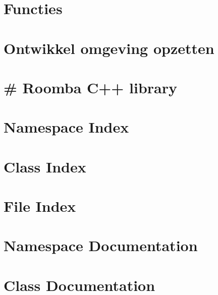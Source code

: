 \documentclass[twoside]{book}
\newcommand{\+}{\discretionary{\mbox{\scriptsize$\hookleftarrow$}}{}{}}
\begin{document}
\chapter{Functies}
\label{md__c___users_crtak__roomba_project_cpp__documentatie__m_d__functies__r_o_o_m_b_a_lib}

\chapter{Ontwikkel omgeving opzetten}
\label{md__c___users_crtak__roomba_project_cpp__documentatie__m_d__omgeving_opzetten}

\chapter{\# Roomba C++ library}
\label{md__c___users_crtak__roomba_project_cpp__r_e_a_d_m_e}

\chapter{Namespace Index}

\chapter{Class Index}

\chapter{File Index}

\chapter{Namespace Documentation}

\chapter{Class Documentation}



\end{document}
